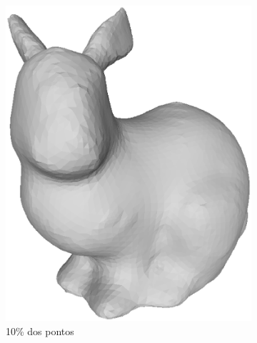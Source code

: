 \begin{figure}[H]
\begin{subfigure}[b]{0.47\textwidth}
		\includegraphics[width=\textwidth]{imagens/cap4/bunny_30.eps}
		\caption{10\% dos pontos}
		\label{fig:ex43}
	\end{subfigure}
	\hfill
	\begin{subfigure}[b]{0.47\textwidth}
		\centering

\end{subfigure}
\end{figure}
